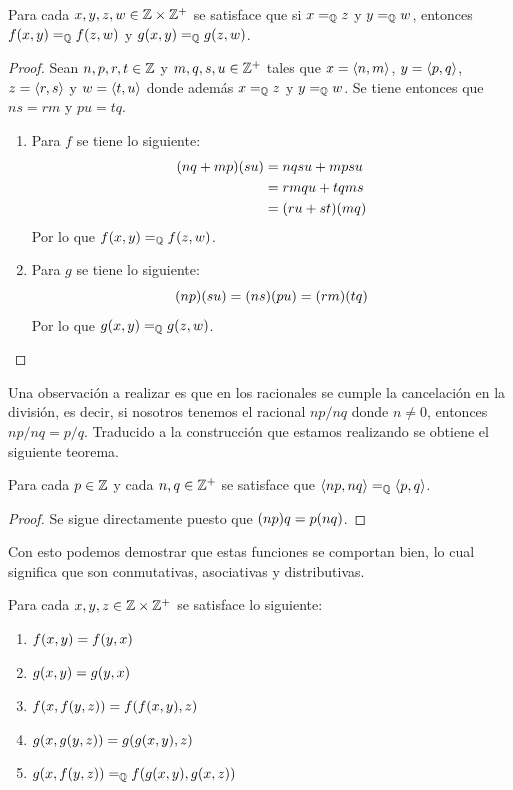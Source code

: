 \begin{lemma}
	\label{lemma: independencia_representantes_q}
	Para cada $x, y, z, w\in\ZZ\times\ZZ^{+}$ se satisface que si $x =_{\QQ} z$ y $y =_{\QQ} w$, entonces $f\pa*{x, y} =_{\QQ} f\pa*{z, w}$ y $g\pa*{x, y} =_{\QQ} g\pa*{z, w}$.
\end{lemma}

\begin{proof}
	Sean $n, p, r, t\in\ZZ$ y $m, q, s, u\in\ZZ^{+}$ tales que $x =\inner*{n, m}$, $y =\inner*{p, q}$, $z =\inner*{r, s}$ y $w =\inner*{t, u}$ donde además $x =_{\QQ} z$ y $y =_{\QQ} w$. Se tiene entonces que $ns = rm$ y $pu = tq$.

	\begin{enumerate}
		\item Para $f$ se tiene lo siguiente:
		\begin{align*}
			\pa*{nq + mp}\pa*{su} &= nqsu + mpsu\\
			&= rmqu + tqms\\
			&=\pa*{ru + st}\pa*{mq}
		\end{align*}
		Por lo que $f\pa*{x, y} =_{\QQ} f\pa*{z, w}$.
		\item Para $g$ se tiene lo siguiente:
		\[
			\pa*{np}\pa*{su} =\pa*{ns}\pa*{pu} =\pa*{rm}\pa*{tq}
		\]
		Por lo que $g\pa*{x, y} =_{\QQ} g\pa*{z, w}$.
	\end{enumerate}
\end{proof}

Una observación a realizar es que en los racionales se cumple la cancelación en la división, es decir, si nosotros tenemos el racional $np/nq$ donde $n\neq 0$, entonces $np/nq = p/q$. Traducido a la construcción que estamos realizando se obtiene el siguiente teorema.

\begin{lemma}
	\label{lemma: cancelacion_cociente}
	Para cada $p\in\ZZ$ y cada $n, q\in\ZZ^{+}$ se satisface que $\inner*{np, nq} =_{\QQ}\inner*{p, q}$.
\end{lemma}

\begin{proof}
	Se sigue directamente puesto que $\pa*{np}q = p\pa*{nq}$.
\end{proof}

Con esto podemos demostrar que estas funciones se comportan bien, lo cual significa que son conmutativas, asociativas y distributivas.

\begin{lemma}
	\label{lemma: prop_suma_prod_q}
	Para cada $x, y, z\in\ZZ\times\ZZ^{+}$ se satisface lo siguiente:

	\begin{enumerate}
		\item $f\pa*{x, y} = f\pa*{y, x}$
		\item $g\pa*{x, y} = g\pa*{y, x}$
		\item $f\pa*{x, f\pa*{y, z}} = f\pa*{f\pa*{x, y}, z}$
		\item $g\pa*{x, g\pa*{y, z}} = g\pa*{g\pa*{x, y}, z}$
		\item $g\pa*{x, f\pa*{y, z}} =_{\QQ} f\pa*{g\pa*{x, y}, g\pa*{x, z}}$
	\end{enumerate}
\end{lemma}

